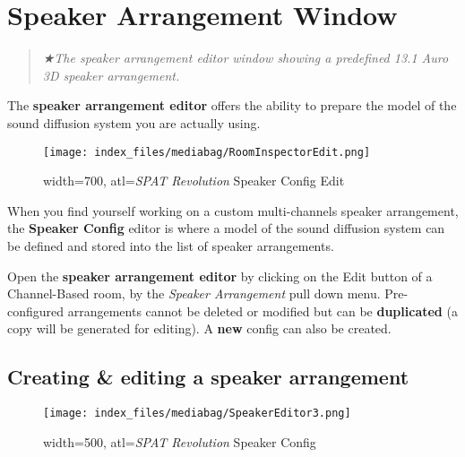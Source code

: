 \documentclass[
  letterpaper,
  DIV=11,
  numbers=noendperiod]{scrreport}
\begin{document}
\hypertarget{speaker-arrangement-window}{%
\chapter{Speaker Arrangement Window}\label{speaker-arrangement-window}}

\begin{quote}
\emph{★The speaker arrangement editor window showing a predefined 13.1
Auro 3D speaker arrangement.}
\end{quote}

The \textbf{speaker arrangement editor} offers the ability to prepare
the model of the sound diffusion system you are actually using.

\begin{figure}

{\centering \texttt{[image: index\_files/mediabag/RoomInspectorEdit.png]}

}

\caption{width=700, atl=\emph{SPAT Revolution} Speaker Config Edit}

\end{figure}

When you find yourself working on a custom multi-channels speaker
arrangement, the \textbf{Speaker Config} editor is where a model of the
sound diffusion system can be defined and stored into the list of
speaker arrangements.

Open the \textbf{speaker arrangement editor} by clicking on the Edit
button of a Channel-Based room, by the \emph{Speaker Arrangement} pull
down menu. Pre-configured arrangements cannot be deleted or modified but
can be \textbf{duplicated} (a copy will be generated for editing). A
\textbf{new} config can also be created.

\hypertarget{creating-editing-a-speaker-arrangement}{%
\section{Creating \& editing a speaker
arrangement}\label{creating-editing-a-speaker-arrangement}}

\begin{figure}

{\centering \texttt{[image: index\_files/mediabag/SpeakerEditor3.png]}

}

\caption{width=500, atl=\emph{SPAT Revolution} Speaker Config}

\end{figure}
\end{document}
